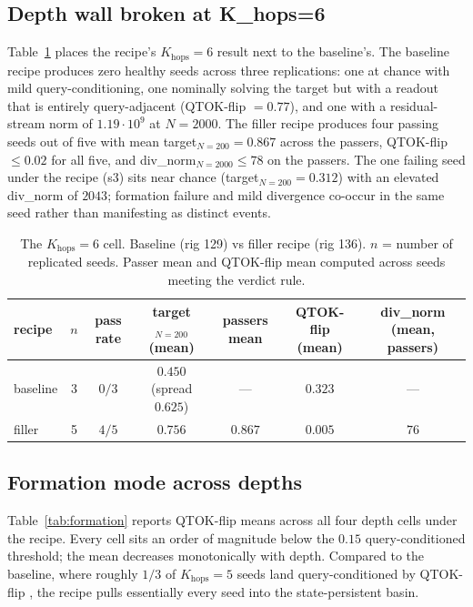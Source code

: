 \documentclass[11pt]{article}
\begin{document}
\subsection{Depth wall broken at K\_hops=6}
\label{sec:depth-wall}

Table~\ref{tab:depth-wall} places the recipe's $K_{\mathrm{hops}}=6$
result next to the baseline's. The baseline recipe produces zero
healthy seeds across three replications: one at chance with mild
query-conditioning, one nominally solving the target but with a
readout that is entirely query-adjacent (QTOK-flip $= 0.77$), and
one with a residual-stream norm of $1.19 \cdot 10^9$ at $N = 2000$.
The filler recipe produces four passing seeds out of five with mean
target$_{N=200} = 0.867$ across the passers, QTOK-flip $\le 0.02$
for all five, and div\_norm$_{N=2000} \le 78$ on the passers. The
one failing seed under the recipe (s3) sits near chance
(target$_{N=200} = 0.312$) with an elevated div\_norm of $2043$;
formation failure and mild divergence co-occur in the same seed
rather than manifesting as distinct events.

\begin{table}[h]
\centering
\small
\caption{The $K_{\mathrm{hops}} = 6$ cell. Baseline (rig 129) vs
filler recipe (rig 136). $n$ = number of replicated seeds. Passer
mean and QTOK-flip mean computed across seeds meeting the
verdict rule.}
\label{tab:depth-wall}
\begin{tabular}{lcccccc}
\toprule
recipe & $n$ & pass rate & target$_{N=200}$ (mean) & passers mean & QTOK-flip (mean) & div\_norm (mean, passers) \\
\midrule
baseline    & 3 & $0/3$ & $0.450$ (spread $0.625$) & --- & $0.323$ & --- \\
filler      & 5 & $4/5$ & $0.756$                  & $0.867$ & $0.005$ & $76$ \\
\bottomrule
\end{tabular}
\end{table}

\subsection{Formation mode across depths}
\label{sec:formation}

Table~\ref{tab:formation} reports QTOK-flip means across all four
depth cells under the recipe. Every cell sits an order of magnitude
below the $0.15$ query-conditioned threshold; the mean decreases
monotonically with depth. Compared to the baseline, where roughly
$1/3$ of $K_{\mathrm{hops}} = 5$ seeds land query-conditioned by
QTOK-flip \citep{fenrir2026}, the recipe pulls essentially every
seed into the state-persistent basin.
\end{document}
